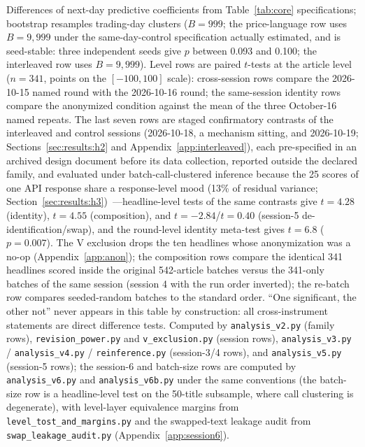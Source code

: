 \begin{table}[htbp]
\begin{threeparttable}
\begin{tablenotes}[flushleft]
\item Differences of next-day predictive coefficients from Table~\ref{tab:core} specifications; bootstrap resamples trading-day clusters ($B=999$; the price-language row uses $B=9{,}999$ under the same-day-control specification actually estimated, and is seed-stable: three independent seeds give $p$ between 0.093 and 0.100; the interleaved row uses $B=9{,}999$). Level rows are paired $t$-tests at the article level ($n=341$, points on the $[-100,100]$ scale): cross-session rows compare the 2026-10-15 named round with the 2026-10-16 round; the same-session identity rows compare the anonymized condition against the mean of the three October-16 named repeats. The last seven rows are staged confirmatory contrasts of the interleaved and control sessions (2026-10-18, a mechanism sitting, and 2026-10-19; Sections~\ref{sec:results:h2} and Appendix~\ref{app:interleaved}), each pre-specified in an archived design document before its data collection, reported outside the declared family, and evaluated under batch-call-clustered inference because the 25 scores of one API response share a response-level mood (13\% of residual variance; Section~\ref{sec:results:h3})~---headline-level tests of the same contrasts give $t=4.28$ (identity), $t=4.55$ (composition), and $t=-2.84$/$t=0.40$ (session-5 de-identification/swap), and the round-level identity meta-test gives $t=6.8$ ($p=0.007$). The V exclusion drops the ten headlines whose anonymization was a no-op (Appendix~\ref{app:anon}); the composition rows compare the identical 341 headlines scored inside the original 542-article batches versus the 341-only batches of the same session (session 4 with the run order inverted); the re-batch row compares seeded-random batches to the standard order. ``One significant, the other not'' never appears in this table by construction: all cross-instrument statements are direct difference tests. Computed by \texttt{analysis\_v2.py} (family rows), \texttt{revision\_power.py} and \texttt{v\_exclusion.py} (session rows), \texttt{analysis\_v3.py} / \texttt{analysis\_v4.py} / \texttt{reinference.py} (session-3/4 rows), and \texttt{analysis\_v5.py} (session-5 rows); the session-6 and batch-size rows are computed by \texttt{analysis\_v6.py} and \texttt{analysis\_v6b.py} under the same conventions (the batch-size row is a headline-level test on the 50-title subsample, where call clustering is degenerate), with level-layer equivalence margins from \texttt{level\_tost\_and\_margins.py} and the swapped-text leakage audit from \texttt{swap\_leakage\_audit.py} (Appendix~\ref{app:session6}).
\end{tablenotes}
\end{threeparttable}
\end{table}

